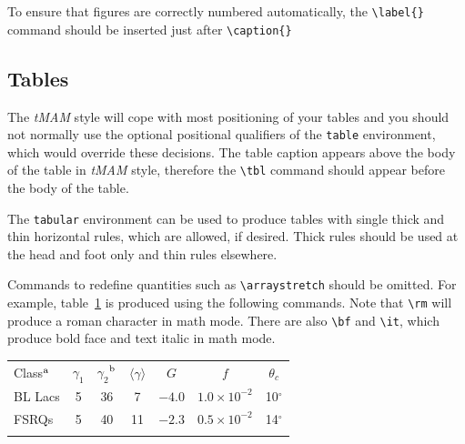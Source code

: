 \documentclass[]{tMAM2e}
\begin{document}
To ensure that figures are correctly numbered automatically, the \verb"\label{}" command should be inserted just
after \verb"\caption{}"

\subsection{Tables}

The {\it tMAM} style will cope with most positioning of your tables
and you should not normally use the optional positional qualifiers
of the {\tt table} environment, which would override these
decisions. The table caption appears above the body of the table in
{\it tMAM} style, therefore the \verb"\tbl" command should appear
before the body of the table.

The {\tt tabular} environment can be used to produce tables with
single thick and thin horizontal rules, which are allowed, if
desired. Thick rules should be used at the head and foot only and
thin rules elsewhere.

Commands to redefine quantities such as \verb"\arraystretch"
should be omitted. For example, table~\ref{symbols} is produced
using the following commands. Note that \verb"\rm" will produce a
roman character in math mode. There are also \verb"\bf" and
\verb"\it", which produce bold face and text italic in math mode.
\begin{table}
{\begin{tabular}{@{}lcccccc}\toprule
   Class$^{\rm a}$
  & $\gamma _1$ & $\gamma _2$$^{\rm b}$
         & $\langle \gamma \rangle$
         & $G$ & $f$ & $\theta _{c}$ \\
\colrule
   BL Lacs &5 & 36 & 7 & $-4.0$
         & $1.0\times 10^{-2}$ & 10$^\circ$ \\
   FSRQs & 5 & 40 & 11 & $-2.3$
         & $0.5\times 10^{-2}$ & 14$^\circ$ \\
   \botrule
  \end{tabular}}
\label{symbols}
\end{table}
\end{document}
